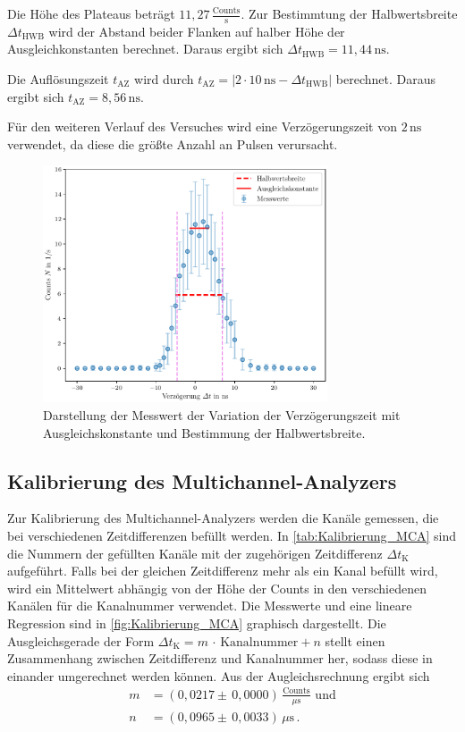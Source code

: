 Die Höhe des Plateaus beträgt $11,27 \, \frac{\text{Counts}}{\unit{\second}}$.
Zur Bestimmtung der Halbwertsbreite $\Delta t_{\text{HWB}}$ wird der Abstand 
beider Flanken auf halber Höhe der Ausgleichkonstanten berechnet.
Daraus ergibt sich $\Delta t_{\text{HWB}} = 11,44 \, \unit{\nano\second}$. 

Die Auflösungszeit $t_{\text{AZ}}$ wird durch  
$t_{\text{AZ}} = |2 \cdot 10 \, \unit{\nano\second}-\Delta t_{\text{HWB}}|$ berechnet.
Daraus ergibt sich $t_{\text{AZ}} = 8,56 \, \unit{\nano\second}$.

Für den weiteren Verlauf des Versuches wird eine Verzögerungszeit von $2 \,\unit{\nano\second}$ verwendet, da diese die 
größte Anzahl an Pulsen verursacht.
\begin{figure}
  \centering
  \includegraphics[width=0.75\textwidth]{Verzoegerung.pdf}
  \caption{Darstellung der Messwert der Variation der Verzögerungszeit mit Ausgleichskonstante und Bestimmung der Halbwertsbreite.}
  \label{fig:Verzoegerung}
\end{figure}
\FloatBarrier

\subsection{Kalibrierung des Multichannel-Analyzers}

Zur Kalibrierung des Multichannel-Analyzers werden die Kanäle 
gemessen, die bei verschiedenen Zeitdifferenzen befüllt werden. 
In \autoref{tab:Kalibrierung_MCA} sind die Nummern der
 gefüllten Kanäle mit der zugehörigen Zeitdifferenz 
 $\Delta t_{\text{K}}$ aufgeführt. Falls bei der gleichen Zeitdifferenz 
 mehr als ein Kanal befüllt wird, wird ein Mittelwert abhängig 
 von der Höhe der Counts in den verschiedenen Kanälen für 
 die Kanalnummer verwendet. Die Messwerte und eine lineare Regression 
 sind in \autoref{fig:Kalibrierung_MCA} graphisch dargestellt. 
 Die Ausgleichsgerade der Form $\Delta t_{\text{K}} = m \, \cdot \,\text{Kanalnummer} + n$
 stellt einen Zusammenhang zwischen Zeitdifferenz und Kanalnummer her, 
 sodass diese in einander umgerechnet werden können. 
 Aus der Augleichsrechnung ergibt sich 
 \begin{align*}
 m &= (0,0217 \pm \, 0,0000) \, \frac{\text{Counts}}{\unit{\mu\second}}\, \, \text{und} \\
 n &= (0,0965 \pm \, 0,0033) \, \unit{\mu\second} \,. 
 \end{align*}


